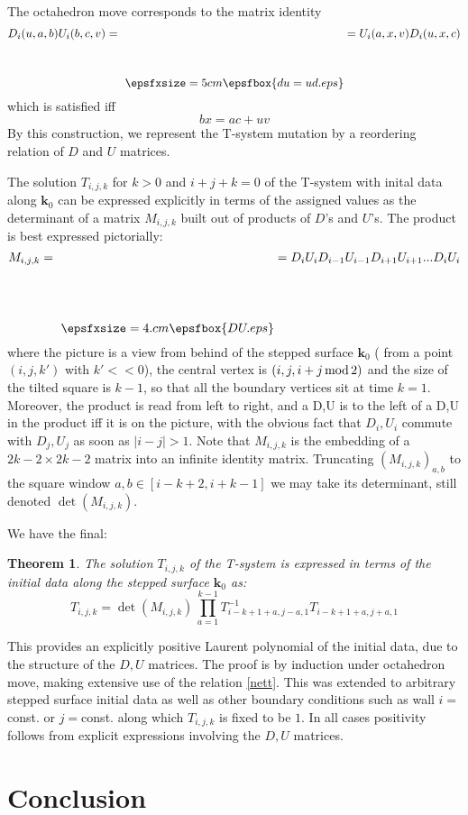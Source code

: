 \documentclass[12pt]{amsart}
\newtheorem{thm}{Theorem}[section]
\numberwithin{equation}{section}
\begin{document}
The octahedron move corresponds to the matrix identity
\begin{equation}
\label{nett}
D_i(u,a,b)U_i(b,c,v)=\raise-1.5cm\hbox{ $\epsfxsize=5cm \epsfbox{du=ud.eps}  $}
=U_i(a,x,v)D_i(u,x,c)
\end{equation}
which is satisfied iff
$$ b x=ac+uv $$
By this construction, we represent the T-system mutation by a reordering relation of $D$ and $U$ matrices.

The solution $T_{i,j,k}$ for $k>0$ and $i+j+k=0$ of the T-system with inital data along ${\mathbf k}_0$ can be expressed
explicitly in terms of the assigned values as the determinant of a matrix $M_{i,j,k}$ built out of products of $D$'s and $U$'s. 
The 
product is best expressed pictorially:
$$ M_{i,j,k} = \raise-2.cm\hbox{ $\epsfxsize=4.cm \epsfbox{DU.eps}  $} =D_i U_i D_{i-1}U_{i-1}D_{i+1}U_{i+1} ... D_i U_i$$
where the picture is a view from behind of the stepped surface ${\mathbf k}_0$ ( from a point $(i,j,k')$ with $k'<<0$),
the central vertex is $(i,j,i+j\, {\rm mod}\, 2)$ and the size of the tilted square is $k-1$, so that all the boundary vertices
sit at time $k=1$. Moreover, the product is read from left to right, and a D,U is to the left of a D,U in the product iff
it is on the picture, with the obvious fact that $D_i,U_i$ commute with $D_j,U_j$ as soon as $|i-j|>1$. Note that $M_{i,j,k}$
is the embedding of a $2k-2\times 2k-2$ matrix into an infinite identity matrix. Truncating $(M_{i,j,k})_{a,b}$ 
to the square window $a,b\in [i-k+2,i+k-1]$ we may take its determinant, still denoted $\det(M_{i,j,k})$.

We have the final:
\begin{thm}\cite{DFK12}\label{solT}
The solution $T_{i,j,k}$ of the T-system is expressed in terms of the initial data along the stepped surface ${\mathbf k}_0$ as:
$$T_{i,j,k}=\det(M_{i,j,k}) \, \prod_{a=1}^{k-1} T_{i-k+1+a,j-a,1}^{-1}T_{i-k+1+a,j+a,1}$$
\end{thm}

This provides an explicitly positive Laurent polynomial of the initial data, due to the structure of the $D,U$ matrices.
The proof is by induction under octahedron move, making extensive use of the relation \eqref{nett}. This was extended to
arbitrary stepped surface initial data\cite{DFK12} as well as other boundary conditions such as wall $i=$const.
or $j=$const. along which $T_{i,j,k}$ is fixed to be $1$. In all cases positivity follows from explicit
expressions involving the $D,U$ matrices.

\section{Conclusion}
\end{document}
